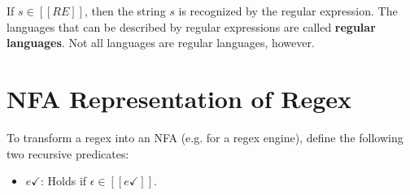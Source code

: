 \documentclass[11pt]{article}
\begin{document}
		If $s \in [[RE]]$, then the string $s$ is recognized by the regular expression. The languages that can be described by regular expressions are called \textbf{regular languages}. Not all languages are regular languages, however.
		
\section{NFA Representation of Regex}
	To transform a regex into an NFA (e.g. for a regex engine), define the following two recursive predicates:
	\begin{itemize}
		\item $e\checkmark$: Holds if $\epsilon \in [[e\checkmark]]$.
	\end{itemize}

%		
%		


\end{document}
